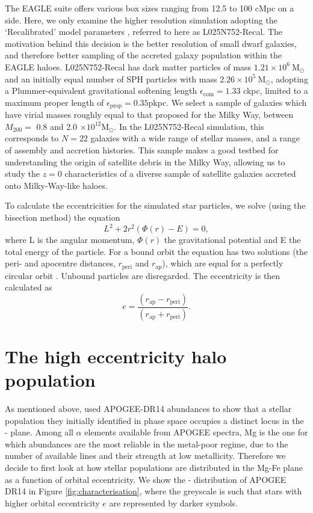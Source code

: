 The EAGLE suite offers various box sizes ranging from 12.5 to
100 cMpc on a side. Here, we only examine the higher resolution
simulation adopting the `Recalibrated' model parameters
\citep[see][]{2015MNRAS.446..521S}, referred to here as L025N752-Recal.
The motivation behind this decision is the better resolution of
small dwarf galaxies, and therefore better sampling of the accreted
galaxy population within the EAGLE haloes. L025N752-Recal has dark
matter particles of mass $1.21\times 10^{6}\ \mathrm{M_{\odot}}$
and an initially equal number of SPH particles with mass $2.26\times
10^{5}\ \mathrm{M_{\odot}}$, adopting a Plummer-equivalent gravitational
softening length $\epsilon_\mathrm{com}=1.33$ ckpc, limited to a
maximum proper length of $\epsilon_\mathrm{prop}=0.35$pkpc. We
select a sample of galaxies which have virial masses roughly equal
to that proposed for the Milky Way, between $M_{200} = $ 0.8 and 2.0 $ \times
10^{12}\mathrm{M_{\odot}}$. In the L025N752-Recal
simulation, this corresponds to $N=22$ galaxies with a wide range of
stellar masses, and a range of assembly and accretion histories.
This sample makes a good testbed for understanding the origin of
satellite debris in the Milky Way, allowing us to study the $z=0$
characteristics of a diverse sample of satellite galaxies accreted
onto Milky-Way-like haloes.

To calculate the eccentricities for the simulated star particles,
we solve (using the bisection method) the equation
\begin{equation}
L^2 + 2 r^2 (\Phi(r) - E) = 0 ,
\end{equation}
where L is the angular momentum, $\Phi(r)$ the gravitational potential
and E the total energy of the particle. For a bound orbit the
equation has two solutions (the peri- and apocentre distances, $r_\mathrm{peri}$
and $r_\mathrm{ap}$), which are equal for a perfectly circular orbit \citep[][eq.
3.14]{2008gady.book.....B}. Unbound particles are disregarded.  The
eccentricity is then calculated as
\begin{equation}
e = \frac{(r_\mathrm{ap}-r_\mathrm{peri}) }{(r_\mathrm{ap}+r_\mathrm{peri}) }.
\end{equation}



\section{The high eccentricity halo population} \label{highe}

As mentioned above, \citet{2018arXiv180606038H} used APOGEE-DR14
abundances to show that a stellar population they initially identified
in phase space occupies a distinct locus in the \afe{}-\feh{} plane.
Among all $\alpha$ elements available from APOGEE spectra, 
Mg is the one for which abundances are the most reliable in the
metal-poor regime, due to the number of available lines and their
strength at low metallicity.  Therefore we decide to first look at
how stellar populations are distributed in the Mg-Fe plane as a
function of orbital eccentricity.  We show the \mgfe{}-\feh{}
distribution of APOGEE DR14 in Figure \ref{fig:characterisation},
where the greyscale is such that stars with higher orbital eccentricity
$e$ are represented by darker symbols.

